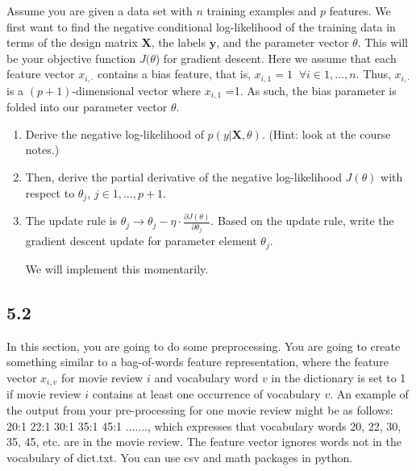 \documentclass{exam}
\begin{document}
Assume you are given a data set with $n$ training examples and $p$ features. We first want to find the negative conditional log-likelihood of the training data in terms of the design matrix $\mathbf{X}$, the labels $\mathbf{y}$, and the parameter vector $\theta$. This will be your objective function $J(\theta$) for gradient descent. 
Here we assume that each feature vector $x_{i,\cdot}$ contains a bias feature, 
that is, $x_{i,1}  =1 \;\;\forall  i \in {1,. ..,n}.$ Thus, $x_{i,\cdot}$ is a $(p+1)$-dimensional vector where $x_{i,1}$ =1. As such, the bias parameter is folded into our parameter vector $\theta$.
 \\

\begin{enumerate}[label=(\alph*)]
\item Derive the negative log-likelihood of $p (y|\mathbf{X},\theta)$. (Hint: look at the course notes.)

\item Then, derive the partial derivative of the negative log-likelihood $J(\theta)$ with respect to $\theta_{j}$, $j \in {1,...,p+1}$.

\item The update rule is $\theta_{j} \to\theta _{j} - \eta\cdot\frac{\partial J(\theta) }{\partial \theta_{j}}$.
Based on the update rule, write the gradient descent update for parameter element  $\theta_{j}$. 

We will implement this momentarily.
\end{enumerate}

\subsection*{5.2}

In this section, you are going to do some preprocessing. You are going to create something similar to a bag-of-words feature representation, where the feature vector $x_{i,v}$ for movie review $i$ and vocabulary word $v$ in the dictionary is set to 1 if movie review $i$ contains at least one occurrence of vocabulary $v$. 
An example of the output from your pre-processing for one movie review might be as follows:
20:1  22:1  30:1  35:1 45:1 .......,
which expresses that vocabulary words 20, 22, 30, 35, 45, etc$.$ are in the movie review.
The feature vector ignores words not in the vocabulary of dict.txt. You can use csv and math packages in python. 
\end{document}
